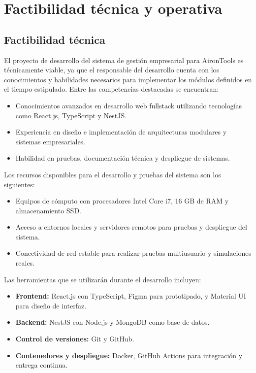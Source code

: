 



\section{Factibilidad técnica y operativa}

\subsection{Factibilidad técnica}

El proyecto de desarrollo del sistema de gestión empresarial para AironTools es técnicamente viable, ya que el responsable del desarrollo cuenta con los conocimientos y habilidades necesarios para implementar los módulos definidos en el tiempo estipulado. Entre las competencias destacadas se encuentran:

\begin{itemize}
	\item Conocimientos avanzados en desarrollo web fullstack utilizando tecnologías como React.js, TypeScript y NestJS.
	\item Experiencia en diseño e implementación de arquitecturas modulares y sistemas empresariales.
	\item Habilidad en pruebas, documentación técnica y despliegue de sistemas.
\end{itemize}

Los recursos disponibles para el desarrollo y pruebas del sistema son los siguientes:

\begin{itemize}
	\item Equipos de cómputo con procesadores Intel Core i7, 16 GB de RAM y almacenamiento SSD.
	\item Acceso a entornos locales y servidores remotos para pruebas y despliegue del sistema.
	\item Conectividad de red estable para realizar pruebas multiusuario y simulaciones reales.
\end{itemize}

Las herramientas que se utilizarán durante el desarrollo incluyen:

\begin{itemize}
	\item \textbf{Frontend:} React.js con TypeScript, Figma para prototipado, y Material UI para diseño de interfaz.
	\item \textbf{Backend:} NestJS con Node.js y MongoDB como base de datos.
	\item \textbf{Control de versiones:} Git y GitHub.
	\item \textbf{Contenedores y despliegue:} Docker, GitHub Actions para integración y entrega continua.
\end{itemize}

